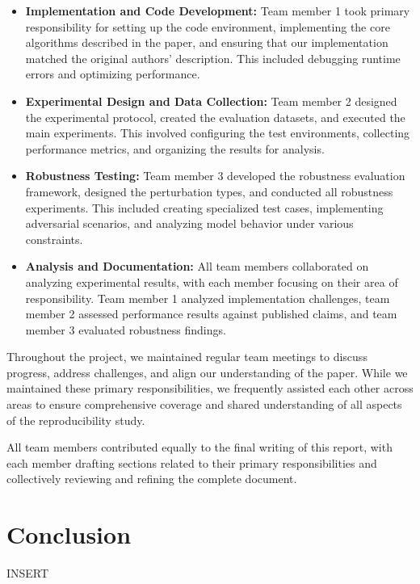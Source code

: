\documentclass[11pt,a4paper]{article}
\begin{document}
\begin{itemize}
    \item \textbf{Implementation and Code Development:} Team member 1 took primary responsibility for setting up the code environment, implementing the core algorithms described in the paper, and ensuring that our implementation matched the original authors' description. This included debugging runtime errors and optimizing performance.
    
    \item \textbf{Experimental Design and Data Collection:} Team member 2 designed the experimental protocol, created the evaluation datasets, and executed the main experiments. This involved configuring the test environments, collecting performance metrics, and organizing the results for analysis.
    
    \item \textbf{Robustness Testing:} Team member 3 developed the robustness evaluation framework, designed the perturbation types, and conducted all robustness experiments. This included creating specialized test cases, implementing adversarial scenarios, and analyzing model behavior under various constraints.
    
    \item \textbf{Analysis and Documentation:} All team members collaborated on analyzing experimental results, with each member focusing on their area of responsibility. Team member 1 analyzed implementation challenges, team member 2 assessed performance results against published claims, and team member 3 evaluated robustness findings.
\end{itemize}

Throughout the project, we maintained regular team meetings to discuss progress, address challenges, and align our understanding of the paper. While we maintained these primary responsibilities, we frequently assisted each other across areas to ensure comprehensive coverage and shared understanding of all aspects of the reproducibility study.

All team members contributed equally to the final writing of this report, with each member drafting sections related to their primary responsibilities and collectively reviewing and refining the complete document.

\section{Conclusion}
INSERT
\end{document}
